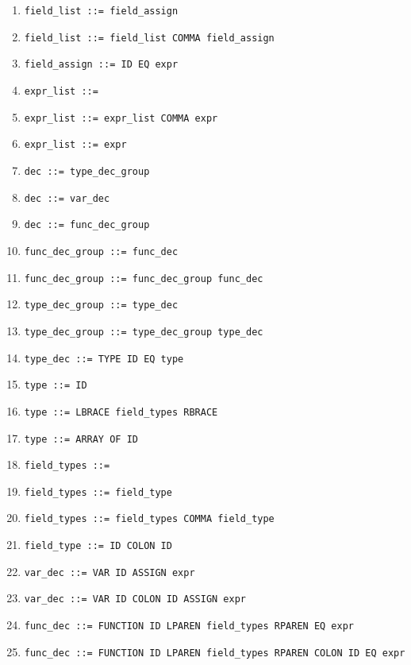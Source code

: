\documentclass{article}
\begin{document}
\begin{enumerate}
  \item \verb|field_list ::= field_assign|

  \item \verb|field_list ::= field_list COMMA field_assign|

  \item \verb|field_assign ::= ID EQ expr|

  \item \verb|expr_list ::=|

  \item \verb|expr_list ::= expr_list COMMA expr|

  \item \verb|expr_list ::= expr|

  \item \verb|dec ::= type_dec_group|

  \item \verb|dec ::= var_dec|

  \item \verb|dec ::= func_dec_group|

  \item \verb|func_dec_group ::= func_dec|

  \item \verb|func_dec_group ::= func_dec_group func_dec|

  \item \verb|type_dec_group ::= type_dec|

  \item \verb|type_dec_group ::= type_dec_group type_dec|

  \item \verb|type_dec ::= TYPE ID EQ type|

  \item \verb|type ::= ID|

  \item \verb|type ::= LBRACE field_types RBRACE|

  \item \verb|type ::= ARRAY OF ID|

  \item \verb|field_types ::=|

  \item \verb|field_types ::= field_type|

  \item \verb|field_types ::= field_types COMMA field_type|

  \item \verb|field_type ::= ID COLON ID|

  \item \verb|var_dec ::= VAR ID ASSIGN expr|

  \item \verb|var_dec ::= VAR ID COLON ID ASSIGN expr|

  \item \verb|func_dec ::= FUNCTION ID LPAREN field_types RPAREN EQ expr|

  \item \verb|func_dec ::= FUNCTION ID LPAREN field_types RPAREN COLON ID EQ expr|
\end{enumerate}
\end{document}
